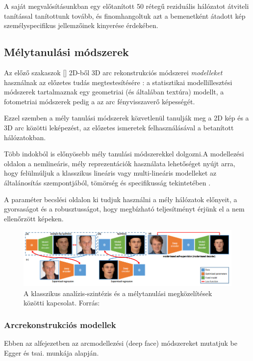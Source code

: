 \documentclass[12pt,a4]{article}
\begin{document}
    A saját megvalósításunkban egy előtanított 50 rétegű reziduális hálózatot átviteli tanítással tanítottunk tovább, és finomhangoltuk azt a bemenetként átadott kép személyspecifikus jellemzőinek kinyerése érdekében.
    
    \subsection{Mélytanulási módszerek}
	
	Az előző szakaszok [] 2D-ből 3D arc rekonstrukciós módszerei \textit{modelleket} használnak az előzetes tudás megtestesítésére \cite{survey}: a statisztikai modellillesztési módszerek tartalmaznak egy geometriai (és általában textúra) modellt, a fotometriai módszerek pedig a
	az arc fényvisszaverő képességét. 
	
	
	Ezzel szemben a mély tanulási módszerek
	közvetlenül tanulják meg a 2D kép és a 3D arc közötti leképezést, az előzetes ismeretek felhasználásával a betanított hálózatokban.
	
	
	Több indokból is előnyösebb mély tanulási módszerekkel dolgozni.\cite{3dmm}A modellezési oldalon a nemlineáris, mély reprezentációk használata lehetőséget nyújt arra, hogy felülmúljuk a klasszikus lineáris vagy multi-lineáris modelleket az általánosítás szempontjából, tömörség és specifikusság tekintetében \cite{styner}.
	
	
	A paraméter becslési oldalon ki tudjuk használni a mély hálózatok előnyeit, a gyorsaságot és a robusztusságot, hogy megbízható teljesítményt érjünk el a nem ellenőrzött képeken.
	
	\begin{figure}[h]	
		\centering
		\includegraphics[width=1\linewidth]{deep}
		\caption{A klasszikus analízis-szintézis és a mélytanulási megközelítések közötti kapcsolat. 
			Forrás:\cite{3dmm}}
	\end{figure}
	
	\newpage
	\subsubsection{Arcrekonstrukciós modellek}
    Ebben az alfejezetben az arcmodellezési (deep face) módszereket mutatjuk be \cite{3dmm} Egger és tsai. munkája alapján. \\
 
\end{document}
